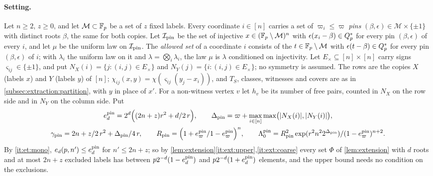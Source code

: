 \paragraph{Setting.}
Let $n\ge2$, $z\ge0$, and let $\mathcal M\subset\Fp$ be a set of $z$ fixed labels.
Every coordinate $i\in[n]$ carries a set of $\varpi_i\le\varpi$ \emph{pins}
$(\beta,\epsilon)\in\mathcal M\times\{\pm1\}$ with distinct roots $\beta$, the same
for both copies. Let $\mathcal I_{\rm pin}$ be the set of injective
$x\in(\Fp\setminus\mathcal M)^n$ with $\epsilon(x_i-\beta)\in\Qsq$ for every pin
$(\beta,\epsilon)$ of every $i$, and let $\mu$ be the uniform law on
$\mathcal I_{\rm pin}$. The \emph{allowed set} of a coordinate $i$ consists of the
$t\in\Fp\setminus\mathcal M$ with $\epsilon(t-\beta)\in\Qsq$ for every pin
$(\beta,\epsilon)$ of $i$; with $\lambda_i$ the uniform law on it and
$\lambda=\bigotimes_i\lambda_i$, the law $\mu$ is $\lambda$ conditioned on
injectivity. Let
$E_\times\subseteq[n]\times[n]$ carry signs $\varsigma_{ij}\in\{\pm1\}$, and put
$N_X(i)=\{j:(i,j)\in E_\times\}$ and $N_Y(j)=\{i:(i,j)\in E_\times\}$; no symmetry
is assumed. The rows are the copies $X$ (labels $x$) and $Y$ (labels $y$) of $[n]$;
$\chi_{ij}(x,y)=\chi(\varsigma_{ij}(y_j-x_i))$, and $T_S$, classes, witnesses and
covers are as in \cref{subsec:extraction:partition}, with $y$ in place of $x'$. For a
non-witness vertex $v$ let $h_v$ be its number of free pairs, counted in $N_X$ on
the row side and in $N_Y$ on the column side. Put
\[
\begin{gathered}
 e^{\rm pin}_d=2^d\Bigl((2n+z)r^2+\frac d2\,r\Bigr),\qquad
 \Delta_{\rm pin}=\varpi+\max_{i\in[n]}\max\bigl(|N_X(i)|,|N_Y(i)|\bigr),\\
 \gamma_{\rm pin}=\frac{2n+z}2\,r^2+\frac{\Delta_{\rm pin}}4\,r,\qquad
 R_{\rm pin}=\Bigl(\frac{1+e^{\rm pin}_\varpi}{1-e^{\rm pin}_\varpi}\Bigr)^n,\qquad
 \Lambda^{\rm pin}_0=\frac{R_{\rm pin}^2\exp(r^2n^22^{\Delta_{\rm pin}})}
 {(1-e^{\rm pin}_\varpi)^{n+2}}.
\end{gathered}
\]
By \ref{it:et:mono}, $e_d(p,n')\le e^{\rm pin}_d$ for $n'\le2n+z$; so by
\cref{lem:extension}\ref{it:ext:upper},\ref{it:ext:coarse} every set $\Phi$ of
\cref{lem:extension} with $d$ roots and at most $2n+z$ excluded labels has between
$p2^{-d}(1-e^{\rm pin}_d)$ and $p2^{-d}(1+e^{\rm pin}_d)$ elements, and the upper
bound needs no condition on the exclusions.

